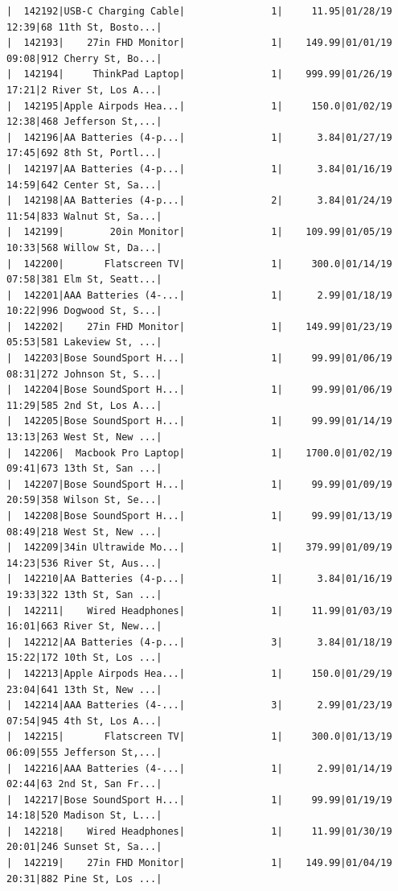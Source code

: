 \documentclass[
  letterpaper,
  DIV=11,
  numbers=noendperiod]{scrartcl}
\begin{document}
\begin{verbatim}
|  142192|USB-C Charging Cable|               1|     11.95|01/28/19 12:39|68 11th St, Bosto...|
|  142193|    27in FHD Monitor|               1|    149.99|01/01/19 09:08|912 Cherry St, Bo...|
|  142194|     ThinkPad Laptop|               1|    999.99|01/26/19 17:21|2 River St, Los A...|
|  142195|Apple Airpods Hea...|               1|     150.0|01/02/19 12:38|468 Jefferson St,...|
|  142196|AA Batteries (4-p...|               1|      3.84|01/27/19 17:45|692 8th St, Portl...|
|  142197|AA Batteries (4-p...|               1|      3.84|01/16/19 14:59|642 Center St, Sa...|
|  142198|AA Batteries (4-p...|               2|      3.84|01/24/19 11:54|833 Walnut St, Sa...|
|  142199|        20in Monitor|               1|    109.99|01/05/19 10:33|568 Willow St, Da...|
|  142200|       Flatscreen TV|               1|     300.0|01/14/19 07:58|381 Elm St, Seatt...|
|  142201|AAA Batteries (4-...|               1|      2.99|01/18/19 10:22|996 Dogwood St, S...|
|  142202|    27in FHD Monitor|               1|    149.99|01/23/19 05:53|581 Lakeview St, ...|
|  142203|Bose SoundSport H...|               1|     99.99|01/06/19 08:31|272 Johnson St, S...|
|  142204|Bose SoundSport H...|               1|     99.99|01/06/19 11:29|585 2nd St, Los A...|
|  142205|Bose SoundSport H...|               1|     99.99|01/14/19 13:13|263 West St, New ...|
|  142206|  Macbook Pro Laptop|               1|    1700.0|01/02/19 09:41|673 13th St, San ...|
|  142207|Bose SoundSport H...|               1|     99.99|01/09/19 20:59|358 Wilson St, Se...|
|  142208|Bose SoundSport H...|               1|     99.99|01/13/19 08:49|218 West St, New ...|
|  142209|34in Ultrawide Mo...|               1|    379.99|01/09/19 14:23|536 River St, Aus...|
|  142210|AA Batteries (4-p...|               1|      3.84|01/16/19 19:33|322 13th St, San ...|
|  142211|    Wired Headphones|               1|     11.99|01/03/19 16:01|663 River St, New...|
|  142212|AA Batteries (4-p...|               3|      3.84|01/18/19 15:22|172 10th St, Los ...|
|  142213|Apple Airpods Hea...|               1|     150.0|01/29/19 23:04|641 13th St, New ...|
|  142214|AAA Batteries (4-...|               3|      2.99|01/23/19 07:54|945 4th St, Los A...|
|  142215|       Flatscreen TV|               1|     300.0|01/13/19 06:09|555 Jefferson St,...|
|  142216|AAA Batteries (4-...|               1|      2.99|01/14/19 02:44|63 2nd St, San Fr...|
|  142217|Bose SoundSport H...|               1|     99.99|01/19/19 14:18|520 Madison St, L...|
|  142218|    Wired Headphones|               1|     11.99|01/30/19 20:01|246 Sunset St, Sa...|
|  142219|    27in FHD Monitor|               1|    149.99|01/04/19 20:31|882 Pine St, Los ...|

\end{verbatim}
\end{document}
